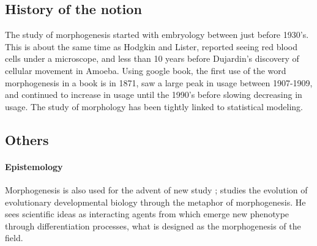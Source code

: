 \documentclass[fleqn,10pt]{wlscirep}
\begin{document}






\subsection*{History of the notion}
The study of morphogenesis started with embryology between just before 1930's. This is about the same time as Hodgkin and Lister, reported seeing red blood cells under a microscope, and less than 10 years before Dujardin's discovery of cellular movement in Amoeba. \cite{abercrombie1977concepts} Using google book, the first use of the word morphogenesis in a book is in 1871, saw a large peak in usage between 1907-1909, and continued to increase in usage until the 1990's before slowing decreasing in usage. 
The study of morphology has been tightly linked to statistical modeling. 



\subsection*{Others}

\paragraph{Epistemology}

Morphogenesis is also used for the advent of new study ;  \cite{gilbert2003morphogenesis} studies the evolution of evolutionary developmental biology through the metaphor of morphogenesis. He sees scientific ideas as interacting agents from which emerge new phenotype through differentiation processes, what is designed as the morphogenesis of the field.
\end{document}
